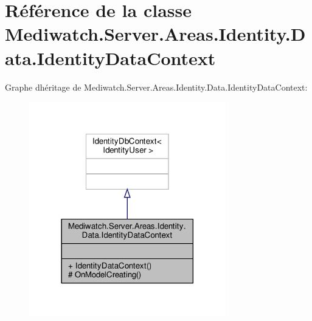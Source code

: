 \hypertarget{class_mediwatch_1_1_server_1_1_areas_1_1_identity_1_1_data_1_1_identity_data_context}{}\section{Référence de la classe Mediwatch.\+Server.\+Areas.\+Identity.\+Data.\+Identity\+Data\+Context}
\label{class_mediwatch_1_1_server_1_1_areas_1_1_identity_1_1_data_1_1_identity_data_context}


Graphe d\textquotesingle{}héritage de Mediwatch.\+Server.\+Areas.\+Identity.\+Data.\+Identity\+Data\+Context\+:
\nopagebreak
\begin{figure}[H]
\begin{center}
\leavevmode
\includegraphics[width=242pt]{class_mediwatch_1_1_server_1_1_areas_1_1_identity_1_1_data_1_1_identity_data_context__inherit__graph}
\end{center}
\end{figure}


